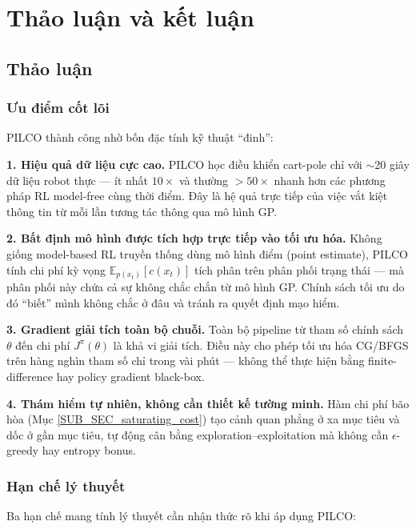 \section{Thảo luận và kết luận}
\label{SEC_conclusion}

\subsection{Thảo luận}
\label{SUB_SEC_discussion}

\subsubsection{Ưu điểm cốt lõi}
\label{SUB_SUB_SEC_advantages}

PILCO thành công nhờ bốn đặc tính kỹ thuật ``đinh'':

\textbf{1. Hiệu quả dữ liệu cực cao.} PILCO học điều khiển cart-pole chỉ với $\sim$20 giây dữ liệu robot thực --- ít nhất $10\times$ và thường $>50\times$ nhanh hơn các phương pháp RL model-free cùng thời điểm. Đây là hệ quả trực tiếp của việc vắt kiệt thông tin từ mỗi lần tương tác thông qua mô hình GP.

\textbf{2. Bất định mô hình được tích hợp trực tiếp vào tối ưu hóa.} Không giống model-based RL truyền thống dùng mô hình điểm (point estimate), PILCO tính chi phí kỳ vọng $\mathbb{E}_{p(x_t)}[c(x_t)]$ tích phân trên phân phối trạng thái --- mà phân phối này chứa cả sự không chắc chắn từ mô hình GP. Chính sách tối ưu do đó ``biết'' mình không chắc ở đâu và tránh ra quyết định mạo hiểm.

\textbf{3. Gradient giải tích toàn bộ chuỗi.} Toàn bộ pipeline từ tham số chính sách $\theta$ đến chi phí $J^\pi(\theta)$ là khả vi giải tích. Điều này cho phép tối ưu hóa CG/BFGS trên hàng nghìn tham số chỉ trong vài phút --- không thể thực hiện bằng finite-difference hay policy gradient black-box.

\textbf{4. Thám hiểm tự nhiên, không cần thiết kế tường minh.} Hàm chi phí bão hòa (Mục \ref{SUB_SEC_saturating_cost}) tạo cảnh quan phẳng ở xa mục tiêu và dốc ở gần mục tiêu, tự động cân bằng exploration--exploitation mà không cần $\epsilon$-greedy hay entropy bonus.

\subsubsection{Hạn chế lý thuyết}
\label{SUB_SUB_SEC_theoretical_limits}

Ba hạn chế mang tính lý thuyết cần nhận thức rõ khi áp dụng PILCO:

